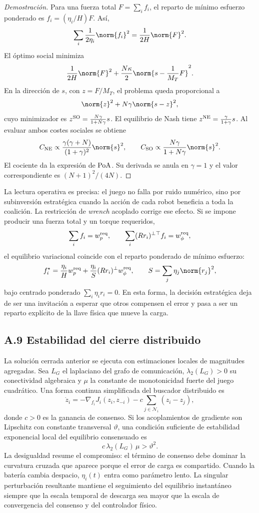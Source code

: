\begin{proof}[Demostración]
Para una fuerza total $F=\sum_i f_i$, el reparto de mínimo esfuerzo ponderado es
$f_i=(\eta_i/H)F$. Así,
\[
  \sum_i\frac{1}{2\eta_i}\norm{f_i}^2
  =
  \frac{1}{2H}\norm{F}^2 .
\]
El óptimo social minimiza
\[
  \frac{1}{2H}\norm{F}^2+
  \frac{N\kappa}{2}
  \norm{s-\frac{1}{M_T}F}^2 .
\]
En la dirección de $s$, con $z=F/M_T$, el problema queda proporcional a
\[
  \norm{z}^2+N\gamma\norm{s-z}^2,
\]
cuyo minimizador es $z^{\rm SO}=\frac{N\gamma}{1+N\gamma}s$. El equilibrio de Nash
tiene $z^{\rm NE}=\frac{\gamma}{1+\gamma}s$. Al evaluar ambos costes sociales se obtiene
\[
  C_{\rm NE}\propto
  \frac{\gamma(\gamma+N)}{(1+\gamma)^2}\norm{s}^2,
  \qquad
  C_{\rm SO}\propto
  \frac{N\gamma}{1+N\gamma}\norm{s}^2 .
\]
El cociente da la expresión de ${\rm PoA}$. Su derivada se anula en $\gamma=1$ y el valor
correspondiente es $(N+1)^2/(4N)$.
\end{proof}

La lectura operativa es precisa: el juego no falla por ruido numérico, sino por
subinversión estratégica cuando la acción de cada robot beneficia a toda la coalición.
La restricción de \emph{wrench} acoplado corrige ese efecto. Si se impone producir una
fuerza total y un torque requeridos,
\[
  \sum_i f_i=w_p^{\rm req},
  \qquad
  \sum_i (Rr_i)^\perp{}^\top f_i=w_\phi^{\rm req},
\]
el equilibrio variacional coincide con el reparto ponderado de mínimo esfuerzo:
\[
  f_i^\star=
  \frac{\eta_i}{H}w_p^{\rm req}
  +
  \frac{\eta_i}{S}(Rr_i)^\perp w_\phi^{\rm req},
  \qquad
  S=\sum_j \eta_j\norm{r_j}^2,
\]
bajo centrado ponderado $\sum_i\eta_i r_i=0$. En esta forma, la decisión estratégica deja
de ser una invitación a esperar que otros compensen el error y pasa a ser un reparto
explícito de la llave física que mueve la carga.

\subsection*{A.9 Estabilidad del cierre distribuido}

La solución cerrada anterior se ejecuta con estimaciones locales de magnitudes agregadas.
Sea $L_G$ el laplaciano del grafo de comunicación, $\lambda_2(L_G)>0$ su conectividad
algebraica y $\mu$ la constante de monotonicidad fuerte del juego cuadrático. Una forma
continua simplificada del buscador distribuido es
\[
  \dot z_i=-\nabla_{f_i}J_i(z_i,z_{-i})-
  c\sum_{j\in\mathcal N_i}(z_i-z_j),
\]
donde $c>0$ es la ganancia de consenso. Si los acoplamientos de gradiente son
Lipschitz con constante transversal $\vartheta$, una condición suficiente de estabilidad
exponencial local del equilibrio consensuado es
\[
  c\,\lambda_2(L_G)\,\mu>\vartheta^2 .
\]
La desigualdad resume el compromiso: el término de consenso debe dominar la curvatura
cruzada que aparece porque el error de carga es compartido. Cuando la batería cambia
despacio, $\eta_i(t)$ entra como parámetro lento. La singular perturbación resultante
mantiene el seguimiento del equilibrio instantáneo siempre que la escala temporal de
descarga sea mayor que la escala de convergencia del consenso y del controlador físico.

